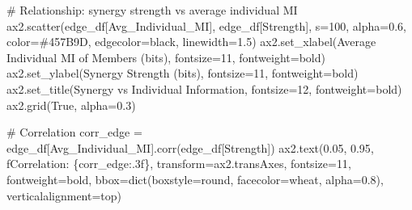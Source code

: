 \documentclass[
  11pt,
  letterpaper,
  oneside,
  openany]{book}
\newenvironment{Shaded}{\begin{snugshade}}{\end{snugshade}}
\newcommand{\BuiltInTok}[1]{\textcolor[rgb]{0.00,0.23,0.31}{#1}}
\newcommand{\CommentTok}[1]{\textcolor[rgb]{0.37,0.37,0.37}{#1}}
\newcommand{\DecValTok}[1]{\textcolor[rgb]{0.68,0.00,0.00}{#1}}
\newcommand{\FloatTok}[1]{\textcolor[rgb]{0.68,0.00,0.00}{#1}}
\newcommand{\NormalTok}[1]{\textcolor[rgb]{0.00,0.23,0.31}{#1}}
\newcommand{\OperatorTok}[1]{\textcolor[rgb]{0.37,0.37,0.37}{#1}}
\newcommand{\SpecialCharTok}[1]{\textcolor[rgb]{0.37,0.37,0.37}{#1}}
\newcommand{\SpecialStringTok}[1]{\textcolor[rgb]{0.13,0.47,0.30}{#1}}
\newcommand{\StringTok}[1]{\textcolor[rgb]{0.13,0.47,0.30}{#1}}
\newcommand{\VariableTok}[1]{\textcolor[rgb]{0.07,0.07,0.07}{#1}}
\begin{document}
\begin{Shaded}
\begin{Highlighting}[]
\CommentTok{\# Relationship: synergy strength vs average individual MI}
\NormalTok{ax2.scatter(edge\_df[}\StringTok{\textquotesingle{}Avg\_Individual\_MI\textquotesingle{}}\NormalTok{], edge\_df[}\StringTok{\textquotesingle{}Strength\textquotesingle{}}\NormalTok{],}
\NormalTok{            s}\OperatorTok{=}\DecValTok{100}\NormalTok{, alpha}\OperatorTok{=}\FloatTok{0.6}\NormalTok{, color}\OperatorTok{=}\StringTok{\textquotesingle{}\#457B9D\textquotesingle{}}\NormalTok{, edgecolor}\OperatorTok{=}\StringTok{\textquotesingle{}black\textquotesingle{}}\NormalTok{, linewidth}\OperatorTok{=}\FloatTok{1.5}\NormalTok{)}
\NormalTok{ax2.set\_xlabel(}\StringTok{\textquotesingle{}Average Individual MI of Members (bits)\textquotesingle{}}\NormalTok{, fontsize}\OperatorTok{=}\DecValTok{11}\NormalTok{, fontweight}\OperatorTok{=}\StringTok{\textquotesingle{}bold\textquotesingle{}}\NormalTok{)}
\NormalTok{ax2.set\_ylabel(}\StringTok{\textquotesingle{}Synergy Strength (bits)\textquotesingle{}}\NormalTok{, fontsize}\OperatorTok{=}\DecValTok{11}\NormalTok{, fontweight}\OperatorTok{=}\StringTok{\textquotesingle{}bold\textquotesingle{}}\NormalTok{)}
\NormalTok{ax2.set\_title(}\StringTok{\textquotesingle{}Synergy vs Individual Information\textquotesingle{}}\NormalTok{, fontsize}\OperatorTok{=}\DecValTok{12}\NormalTok{, fontweight}\OperatorTok{=}\StringTok{\textquotesingle{}bold\textquotesingle{}}\NormalTok{)}
\NormalTok{ax2.grid(}\VariableTok{True}\NormalTok{, alpha}\OperatorTok{=}\FloatTok{0.3}\NormalTok{)}

\CommentTok{\# Correlation}
\NormalTok{corr\_edge }\OperatorTok{=}\NormalTok{ edge\_df[}\StringTok{\textquotesingle{}Avg\_Individual\_MI\textquotesingle{}}\NormalTok{].corr(edge\_df[}\StringTok{\textquotesingle{}Strength\textquotesingle{}}\NormalTok{])}
\NormalTok{ax2.text(}\FloatTok{0.05}\NormalTok{, }\FloatTok{0.95}\NormalTok{, }\SpecialStringTok{f\textquotesingle{}Correlation: }\SpecialCharTok{\{}\NormalTok{corr\_edge}\SpecialCharTok{:.3f\}}\SpecialStringTok{\textquotesingle{}}\NormalTok{, }
\NormalTok{         transform}\OperatorTok{=}\NormalTok{ax2.transAxes, fontsize}\OperatorTok{=}\DecValTok{11}\NormalTok{, fontweight}\OperatorTok{=}\StringTok{\textquotesingle{}bold\textquotesingle{}}\NormalTok{,}
\NormalTok{         bbox}\OperatorTok{=}\BuiltInTok{dict}\NormalTok{(boxstyle}\OperatorTok{=}\StringTok{\textquotesingle{}round\textquotesingle{}}\NormalTok{, facecolor}\OperatorTok{=}\StringTok{\textquotesingle{}wheat\textquotesingle{}}\NormalTok{, alpha}\OperatorTok{=}\FloatTok{0.8}\NormalTok{),}
\NormalTok{         verticalalignment}\OperatorTok{=}\StringTok{\textquotesingle{}top\textquotesingle{}}\NormalTok{)}


\end{Highlighting}
\end{Shaded}
\end{document}
